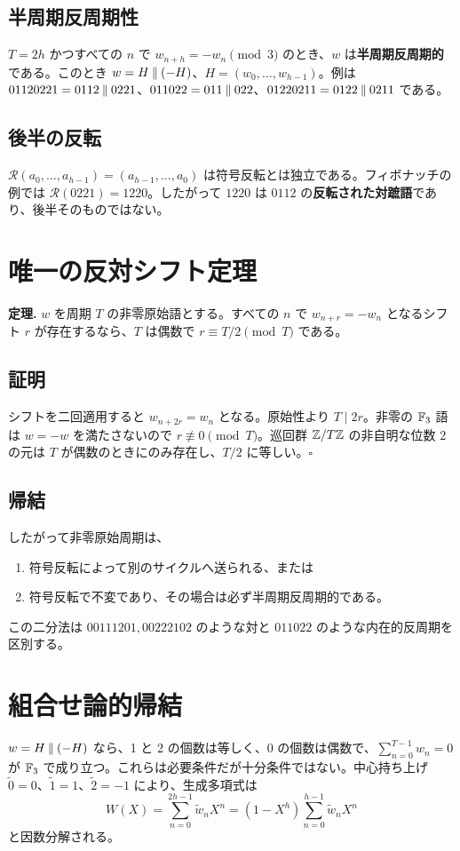 \documentclass[11pt,a4paper]{article}
\begin{document}
\subsection{半周期反周期性}
\(T=2h\) かつすべての \(n\) で \(w_{n+h}=-w_n\pmod3\) のとき、\(w\) は\textbf{半周期反周期的}である。このとき \(w=H\mathbin{\Vert}(-H)\)、\(H=(w_0,\ldots,w_{h-1})\)。例は \(01120221=0112\mathbin{\Vert}0221\)、\(011022=011\mathbin{\Vert}022\)、\(01220211=0122\mathbin{\Vert}0211\) である。
\subsection{後半の反転}
\(\mathcal R(a_0,\ldots,a_{h-1})=(a_{h-1},\ldots,a_0)\) は符号反転とは独立である。フィボナッチの例では \(\mathcal R(0221)=1220\)。したがって \(1220\) は \(0112\) の\textbf{反転された対蹠語}であり、後半そのものではない。
\section{唯一の反対シフト定理}
\begin{summarybox}\textbf{定理.} \(w\) を周期 \(T\) の非零原始語とする。すべての \(n\) で \(w_{n+r}=-w_n\) となるシフト \(r\) が存在するなら、\(T\) は偶数で \(r\equiv T/2\pmod T\) である。\end{summarybox}
\subsection*{証明}
シフトを二回適用すると \(w_{n+2r}=w_n\) となる。原始性より \(T\mid2r\)。非零の \(\mathbb F_3\) 語は \(w=-w\) を満たさないので \(r\not\equiv0\pmod T\)。巡回群 \(\mathbb Z/T\mathbb Z\) の非自明な位数 2 の元は \(T\) が偶数のときにのみ存在し、\(T/2\) に等しい。\hfill\(\square\)
\subsection*{帰結}
したがって非零原始周期は、\begin{enumerate}\item 符号反転によって別のサイクルへ送られる、または\item 符号反転で不変であり、その場合は必ず半周期反周期的である。\end{enumerate} この二分法は \(00111201,00222102\) のような対と \(011022\) のような内在的反周期を区別する。
\section{組合せ論的帰結}
\(w=H\mathbin{\Vert}(-H)\) なら、1 と 2 の個数は等しく、0 の個数は偶数で、\(\sum_{n=0}^{T-1}w_n=0\) が \(\mathbb F_3\) で成り立つ。これらは必要条件だが十分条件ではない。中心持ち上げ \(\widetilde0=0\)、\(\widetilde1=1\)、\(\widetilde2=-1\) により、生成多項式は \[W(X)=\sum_{n=0}^{2h-1}\widetilde w_nX^n=(1-X^h)\sum_{n=0}^{h-1}\widetilde w_nX^n\] と因数分解される。
\end{document}
